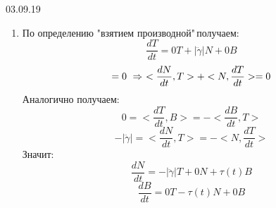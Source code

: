 \documentclass[main]{subfiles}
\begin{document}
\begin{lect}{03.09.19}
\begin{sol}
\begin{enumerate}
            \item По определению "взятием производной"\,получаем:
            \[\dfrac{dT}{dt} = 0T + |\ddot{\gamma}|N + 0B\]
            \[<N, T> = 0 \RA <\frac{d N}{dt}, T> + <N, \frac{d T}{dt}> = 0\]
            Аналогично получаем:
            \[0 = <\frac{d T}{dt},B> = - <\frac{d B}{dt}, T>\]
            \[-|\ddot{\gamma}| = <\frac{d N}{dt}, T> = -<N, \frac{d T}{dt}>\]
            Значит:
            \[\frac{d N}{dt} = -|\ddot{\gamma}|T + 0N + \tau(t)B\]
            \[\frac{d B}{dt} = 0T - \tau(t)N + 0B\]
          \end{enumerate}
        \end{sol}
    \end{lect}
\end{document}
